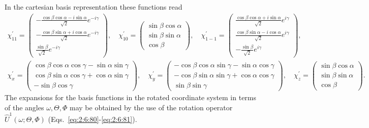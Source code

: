 In the cartesian basis representation these functions read
\begin{gather}
\chi_{11}^{\prime}=\begin{pmatrix}
-\frac{\cos \beta \cos \alpha-i \sin \alpha}{\sqrt{2}} e^{-i \gamma} \\
-\frac{\cos \beta \sin \alpha+i \cos \alpha}{\sqrt{2}} e^{-i \gamma} \\
\frac{\sin \beta}{\sqrt{2}} e^{-i \gamma}
\end{pmatrix}, \quad \chi_{10}^{\prime}=\begin{pmatrix}
\sin \beta \cos \alpha \\
\sin \beta \sin \alpha \\
\cos \beta
\end{pmatrix}, \quad \chi_{1-1}^{\prime}=\begin{pmatrix}
\frac{\cos \beta \cos \alpha+i \sin \alpha}{\sqrt{2}} e^{i \gamma} \\
\frac{\cos \beta \sin \alpha-i \cos \alpha}{\sqrt{2}} e^{i \gamma} \\
-\frac{\sin \beta}{\sqrt{2}} e^{i \gamma}
\end{pmatrix}, \label{eq:6:3:38}\\
\chi_{x}^{\prime}=\begin{pmatrix}
\cos \beta \cos \alpha \cos \gamma-\sin \alpha \sin \gamma \\
\cos \beta \sin \alpha \cos \gamma+\cos \alpha \sin \gamma \\
-\sin \beta \cos \gamma
\end{pmatrix}, \quad \chi_{y}^{\prime}=\begin{pmatrix}
-\cos \beta \cos \alpha \sin \gamma-\sin \alpha \cos \gamma \\
-\cos \beta \sin \alpha \sin \gamma+\cos \alpha \cos \gamma \\
\sin \beta \sin \gamma
\end{pmatrix}, \quad \chi_{z}^{\prime}=\begin{pmatrix}
\sin \beta \cos \alpha \\
\sin \beta \sin \alpha \\
\cos \beta
\end{pmatrix} . \label{eq:6:3:39}
\end{gather}
The expansions for the basis functions in the rotated coordinate system in terms of the angles $\omega, \Theta, \Phi$ may be obtained by the use of the rotation operator $\hat{U}^{1}(\omega ; \Theta, \Phi)$ (Eqs.~\eqref{eq:2:6:80}-\eqref{eq:2:6:81}).

